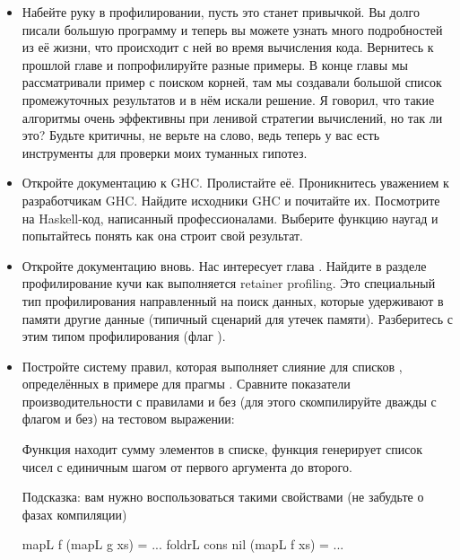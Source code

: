 \begin{itemize}
\item Набейте руку в профилировании, пусть это станет привычкой.
Вы долго писали большую программу и теперь вы можете
узнать много подробностей из её жизни, что происходит с ней
во время вычисления кода. Вернитесь к прошлой главе и 
попрофилируйте разные примеры. В конце главы мы рассматривали
пример с поиском корней, там мы создавали большой список
промежуточных результатов и в нём искали решение.
Я говорил, что такие алгоритмы очень эффективны при 
ленивой стратегии вычислений, но так ли это? Будьте
критичны, не верьте на слово, ведь теперь у вас есть 
инструменты для проверки моих туманных гипотез.

\item Откройте документацию к GHC. Пролистайте её. 
Проникнитесь уважением к разработчикам GHC. 
Найдите исходники GHC и почитайте их. Посмотрите на Haskell-код,
написанный профессионалами. Выберите функцию
наугад и попытайтесь понять как она строит свой результат.


\item Откройте документацию вновь. Нас интересует
глава . Найдите в разделе профилирование
кучи как выполняется retainer profiling. Это специальный
тип профилирования направленный на поиск данных, которые
удерживают в памяти другие данные (типичный сценарий для
утечек памяти). Разберитесь с этим типом профилирования 
(флаг ).

\item Постройте систему правил, которая выполняет 
слияние для списков  , определённых в примере
для прагмы . Сравните показатели производительности
с правилами и без (для этого скомпилируйте дважды с флагом  и без) 
на тестовом выражении:


Функция  находит сумму элементов в списке, 
функция  генерирует список чисел с единичным
шагом от первого аргумента до второго. 

Подсказка: вам нужно воспользоваться такими свойствами
(не забудьте о фазах компиляции)

\begin{code}
mapL f (mapL g xs)              = ...
foldrL cons nil (mapL f xs)     = ...     
\end{code}

\end{itemize}


